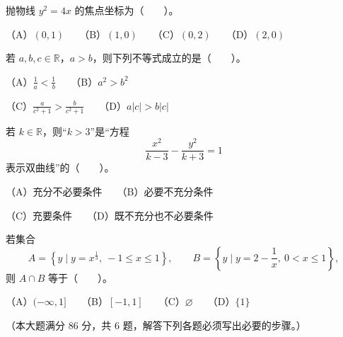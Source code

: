 \begin{question}
抛物线 $y^2=4x$ 的焦点坐标为\mbox{（　　）}。

（A）$(0,1)$　　（B）$(1,0)$　　（C）$(0,2)$　　（D）$(2,0)$

\end{question}
\begin{question}
若 $a,b,c\in\mathbb R$，$a>b$，则下列不等式成立的是\mbox{（　　）}。

（A）$\displaystyle\frac1a<\frac1b$　　（B）$a^2>b^2$

（C）$\displaystyle\frac{a}{c^2+1}>\frac{b}{c^2+1}$　　（D）$a|c|>b|c|$

\end{question}
\begin{question}
若 $k\in\mathbb R$，则“$k>3$”是“方程
\nopagebreak[4]
\[
\frac{x^2}{k-3}-\frac{y^2}{k+3}=1
\]
表示双曲线”的\mbox{（　　）}。

（A）充分不必要条件　　（B）必要不充分条件

（C）充要条件　　（D）既不充分也不必要条件

\end{question}
\begin{question}
若集合
\nopagebreak[4]
\[
A=\left\{y\mid y=x^{\frac13},\ -1\leq x\leq1\right\},\qquad
B=\left\{y\mid y=2-\frac1x,\ 0<x\leq1\right\},
\]
则 $A\cap B$ 等于\mbox{（　　）}。

（A）$(-\infty,1]$　　（B）$[-1,1]$　　（C）$\varnothing$　　（D）$\{1\}$

\end{question}

（本大题满分 86 分，共 6 题，解答下列各题必须写出必要的步骤。）


